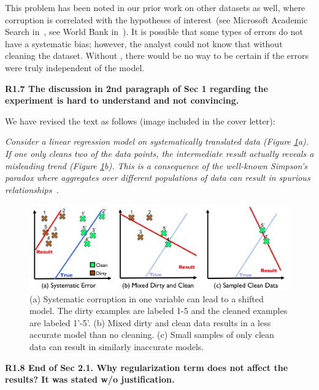 This problem has been noted in our prior work on other datasets as well, where corruption is correlated with the hypotheses of interest~(see Microsoft Academic Search in~\cite{wang1999sample}, see World Bank in~\cite{activecleanarxiv}). It is possible that some types of errors do not have a systematic bias; however, the analyst could not know that without cleaning the dataset.
Without \sys, there would be no way to be certain if the errors were truly independent of the model.

\vspace{0.5em}

\noindent\textbf{R1.7 The discussion in 2nd paragraph of Sec 1 regarding the experiment is hard to understand and not convincing.}

\noindent We have revised the text as follows (image included in the cover letter):

\emph{Consider a linear regression model on systematically translated data (Figure \ref{update-arch-coverletter}a).
If one only cleans two of the data points, the intermediate result actually reveals a misleading trend (Figure \ref{update-arch-coverletter}b).
This is a consequence of the well-known Simpson's paradox where aggregates over different populations of data can result in spurious relationships~\cite{simpson1951interpretation}.}

\begin{figure}[ht!]
\centering
 \includegraphics[width=\columnwidth]{figs/update-arch.png}
 \caption{(a) Systematic corruption in one variable can lead to a shifted model. The dirty examples are labeled 1-5 and the cleaned examples are labeled 1'-5'. 
 (b) Mixed dirty and clean data results in a less accurate model than no cleaning.
(c) Small samples of only clean data can result in similarly inaccurate models. \label{update-arch-coverletter}}
\end{figure}

\vspace{0.5em}

\noindent\textbf{R1.8 End of Sec 2.1. Why regularization term does not affect the results? It was stated w/o justification.}

